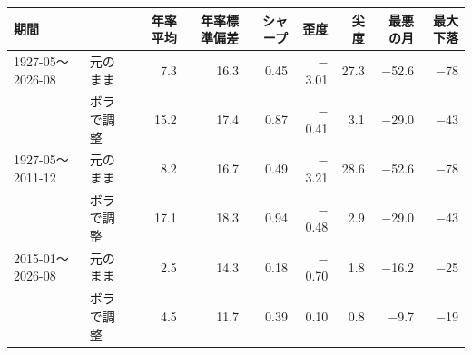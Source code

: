 \begin{tabular}{llrrrrrrr}
\toprule
期間 &  & 年率平均 & 年率標準偏差 & シャープ & 歪度 & 尖度 & 最悪の月 & 最大下落 \\
\midrule
1927-05〜2026-08 & 元のまま & 7.3 & 16.3 & 0.45 & \ensuremath{-}3.01 & 27.3 & \ensuremath{-}52.6 & \ensuremath{-}78 \\
 & ボラで調整 & 15.2 & 17.4 & 0.87 & \ensuremath{-}0.41 & 3.1 & \ensuremath{-}29.0 & \ensuremath{-}43 \\
\midrule
1927-05〜2011-12 & 元のまま & 8.2 & 16.7 & 0.49 & \ensuremath{-}3.21 & 28.6 & \ensuremath{-}52.6 & \ensuremath{-}78 \\
 & ボラで調整 & 17.1 & 18.3 & 0.94 & \ensuremath{-}0.48 & 2.9 & \ensuremath{-}29.0 & \ensuremath{-}43 \\
\midrule
2015-01〜2026-08 & 元のまま & 2.5 & 14.3 & 0.18 & \ensuremath{-}0.70 & 1.8 & \ensuremath{-}16.2 & \ensuremath{-}25 \\
 & ボラで調整 & 4.5 & 11.7 & 0.39 & 0.10 & 0.8 & \ensuremath{-}9.7 & \ensuremath{-}19 \\
\bottomrule
\end{tabular}
